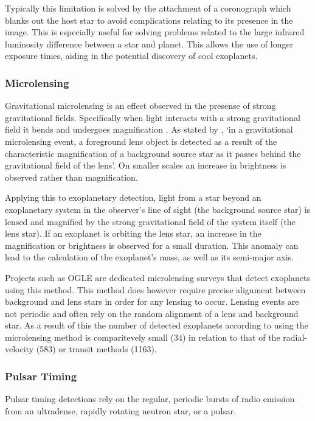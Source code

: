 \documentclass{report}
\begin{document}
Typically this limitation is solved by the attachment of a coronograph which blanks out the host star to avoid complications relating to its presence in the image. This is especially useful for solving problems related to the large infrared luminosity difference between a star and planet. This allows the use of longer exposure times, aiding in the potential discovery of cool exoplanets. 

\subsubsection{Microlensing }
Gravitational microlensing is an effect observed in the presense of strong gravitational fields. Specifically when light interacts with a strong gravitational field it bends and undergoes magnification \parencite{einstein}. As stated by \textcite{micro}, `in a gravitational microlensing event, a foreground lens object is detected as a result of the characteristic magnification of a background source star as it passes behind the gravitational field of the lens'. On smaller scales an increase in brightness is observed rather than magnification.

Applying this to exoplanetary detection, light from a star beyond an exoplanetary system in the observer's line of sight (the background source star) is lensed and magnified by the strong gravitational field of the system itself (the lens star). If an exoplanet is orbiting the lens star, an increase in the magnification or brightness is observed for a small duration. This anomaly can lead to the calculation of the exoplanet's mass, as well as its semi-major axis.

Projects such as OGLE are dedicated microlensing surveys that detect exoplanets using this method. This method does however require precise alignment between background and lens stars in order for any lensing to occur. Lensing events are not periodic and often rely on the random alignment of a lens and background star. As a result of this the number of detected exoplanets according to \textcite{exo} using the microlensing method is comparitevely small (34) in relation to that of the radial-velocity (583) or transit methods (1163). 

\subsubsection{Pulsar Timing}
Pulsar timing detections rely on the regular, periodic bursts of radio emission from an ultradense, rapidly rotating neutron star, or a pulsar.
\end{document}
